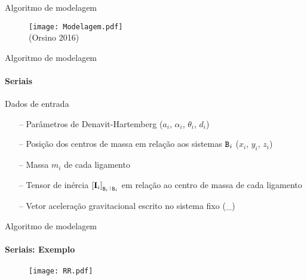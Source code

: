 \documentclass[25pt,landscape]{beamer}
\begin{document}
\begin{frame}{Algoritmo de modelagem}
    \begin{figure}[!h]
        \centering
        \texttt{[image: Modelagem.pdf]} \\
        (Orsino 2016)
    \end{figure}  
\end{frame}

\begin{frame}{Algoritmo de modelagem}
    \framesubtitle{Seriais}
    \pause
    \begin{block}{Dados de entrada}
    	\begin{itemize}
    		\item[--] Par\^ametros de Denavit-Hartemberg ($a_i$, $\alpha_i$, $\theta_i$, $d_i$) \\[8pt]
    		\item[--] Posi\c{c}\~ao dos centros de massa em rela\c{c}\~ao aos sistemas $\mathtt{B}_i$ ($x_i$, $y_i$, $z_i$) \\[8pt]
    		\item[--] Massa $m_i$ de cada ligamento \\[8pt]
    		\item[--] Tensor de in\'ercia $\vct{\vI_i}_{\ttB_i \rl \ttB_i}$ em rela\c{c}\~ao ao centro de massa de cada ligamento \\[8pt]
    		\item[--] Vetor acelera\c{c}\~ao gravitacional escrito no sistema fixo (\vct{\vg}_{\ttN}) \\[8pt]
    	\end{itemize}
    \end{block}
\end{frame}

\begin{frame}{Algoritmo de modelagem}
    \framesubtitle{Seriais: Exemplo}
    \pause
    \begin{figure}[!h]
        \centering
        \texttt{[image: RR.pdf]}
    \end{figure}
\end{frame}
\end{document}
